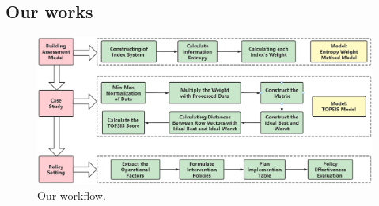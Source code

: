 \subsection{Our works}
    \begin{figure}\centering
        \includegraphics[width=1\textwidth]{figures/Flowchart}
        \caption{Our workflow.} \label{fig:figure1}
    \end{figure}



